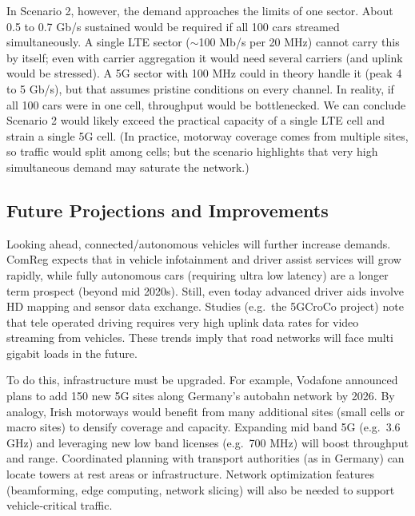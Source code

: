 \documentclass[MScCS]{uccthesis}
\begin{document}
In Scenario 2, however, the demand approaches the limits of one sector. About 0.5 to 0.7 Gb/s sustained would be required if all 100 cars streamed simultaneously. A single LTE sector ($\sim$100 Mb/s per 20 MHz) cannot carry this by itself; even with carrier aggregation it would need several carriers (and uplink would be stressed). A 5G sector with 100 MHz could in theory handle it (peak 4 to 5 Gb/s\cite{devopedia_5g}), but that assumes pristine conditions on every channel. In reality, if all 100 cars were in one cell, throughput would be bottlenecked. We can conclude Scenario 2 would likely exceed the practical capacity of a single LTE cell and strain a single 5G cell. (In practice, motorway coverage comes from multiple sites, so traffic would split among cells; but the scenario highlights that very high simultaneous demand may saturate the network.)

\subsection{Future Projections and Improvements}
Looking ahead, connected/autonomous vehicles will further increase demands. ComReg expects that in vehicle infotainment and driver assist services will grow rapidly, while fully autonomous cars (requiring ultra low latency) are a longer term prospect (beyond mid 2020s)\cite{comreg_autonomous}. Still, even today advanced driver aids involve HD mapping and sensor data exchange. Studies (e.g.\ the 5GCroCo project) note that tele operated driving requires very high uplink data rates for video streaming from vehicles\cite{5gcroc_project}. These trends imply that road networks will face multi gigabit loads in the future.

 To do this, infrastructure must be upgraded. For example, Vodafone announced plans to add 150 new 5G sites along Germany's autobahn network by 2026\cite{vodafone_autobahn}. By analogy, Irish motorways would benefit from many additional sites (small cells or macro sites) to densify coverage and capacity. Expanding mid band 5G (e.g.\ 3.6 GHz) and leveraging new low band licenses (e.g.\ 700 MHz) will boost throughput and range. Coordinated planning with transport authorities (as in Germany\cite{vodafone_autobahn}) can locate towers at rest areas or infrastructure. Network optimization features (beamforming, edge computing, network slicing) will also be needed to support vehicle‐critical traffic.
\end{document}
